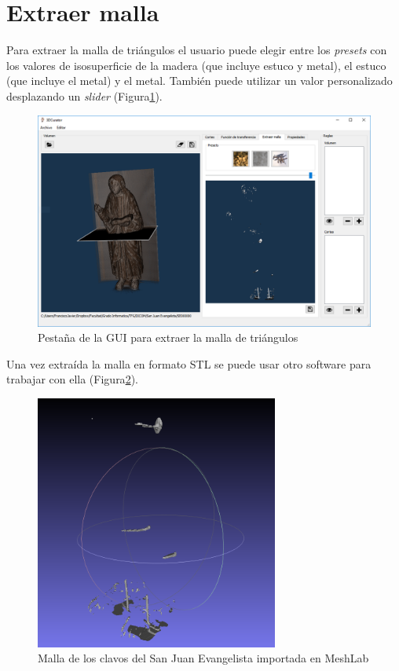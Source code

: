\section{Extraer malla}

Para extraer la malla de triángulos el usuario puede elegir entre los \textit{presets} con los valores de isosuperficie de la madera (que incluye estuco y metal), el estuco (que incluye el metal) y el metal. También puede utilizar un valor personalizado desplazando un \textit{slider} (Figura\ref{fig:pestana_malla}).

\begin{figure}[H]
	\centering
	\includegraphics[width=12.5cm]{imagenes/pestana_malla}
	\caption{Pestaña de la GUI para extraer la malla de triángulos}
	\label{fig:pestana_malla}
\end{figure}

Una vez extraída la malla en formato STL se puede usar otro software para trabajar con ella (Figura\ref{fig:malla_clavos_meshlab}).

\begin{figure}[H]
	\centering
	\includegraphics[width=8cm]{imagenes/malla_clavos_meshlab}
	\caption{Malla de los clavos del San Juan Evangelista importada en MeshLab \cite{meshlab}}
	\label{fig:malla_clavos_meshlab}
\end{figure}
